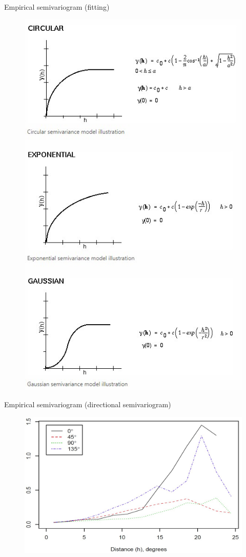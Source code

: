 \documentclass{beamer}
\begin{document}
\begin{frame}{Empirical semivariogram (fitting)}
\vspace{-0.25cm}
\begin{figure}
	\includegraphics[width=.4\textwidth]{IMG/sp_svgm2.jpg}
\end{figure}
\end{frame}
\begin{frame}{Empirical semivariogram (directional semivariogram)}
\begin{figure}
	\includegraphics[width=.8\textwidth]{IMG/sp_svgm3.jpg}
\end{figure}
\end{frame}
\end{document}
